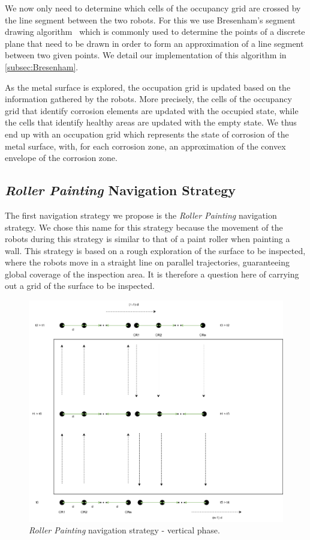 We now only need to determine which cells of the occupancy grid are crossed by the line segment between the two robots.
For this we use Bresenham's segment drawing algorithm~\cite{enwiki:1155124335} which is commonly used to determine the points of a discrete plane that need to be drawn in order to form an approximation of a line segment between two given points.
We detail our implementation of this algorithm in \ref{subsec:Bresenham}.

As the metal surface is explored, the occupation grid is updated based on the information gathered by the robots.
More precisely, the cells of the occupancy grid that identify corrosion elements are updated with the occupied state, while the cells that identify healthy areas are updated with the empty state.
We thus end up with an occupation grid which represents the state of corrosion of the metal surface, with, for each corrosion zone, an approximation of the convex envelope of the corrosion zone.

\subsection{\textit{Roller Painting} Navigation Strategy}

The first navigation strategy we propose is the \textit{Roller Painting} navigation strategy.
We chose this name for this strategy because the movement of the robots during this strategy is similar to that of a paint roller when painting a wall.
This strategy is based on a rough exploration of the surface to be inspected, where the robots move in a straight line on parallel trajectories, guaranteeing global coverage of the inspection area.
It is therefore a question here of carrying out a grid of the surface to be inspected.

\begin{figure}[h!]
	\centering
	\includegraphics[scale=0.45]{graphics/peinture_au_rouleau.png}
	\caption{\textit{Roller Painting} navigation strategy - vertical phase.}
	\label{fig:peinture_au_rouleau}
\end{figure}

